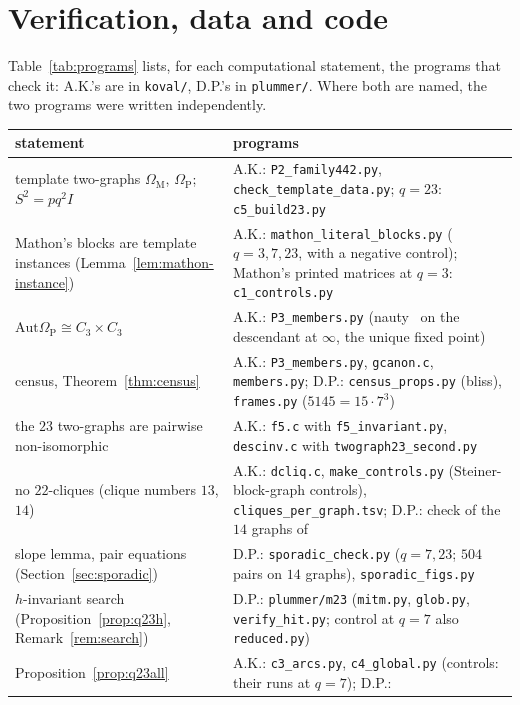 \documentclass[11pt]{amsart}
\theoremstyle{definition}
\theoremstyle{remark}
\newcommand{\Aut}{\mathrm{Aut}}
\newcommand{\code}[1]{\texttt{#1}}
\newcommand{\OM}{\Omega_{\mathrm M}}   %
\newcommand{\OP}{\Omega_{\mathrm P}}   %
\begin{document}
\section{Verification, data and code}\label{sec:verification}
Table~\ref{tab:programs} lists, for each computational statement, the programs that check it: A.K.'s are in
\code{koval/}, D.P.'s in \code{plummer/}. Where both are named, the two programs were written independently.

\begin{table}[!ht]
\centering\small
\begin{tabular}{p{}p{}}
\toprule
statement & programs\\
\midrule
template two-graphs $\OM$, $\OP$; $S^2=pq^2I$ & A.K.: \code{P2\_family442.py}, \code{check\_template\_data.py}; $q=23$: \code{c5\_build23.py}\\
Mathon's blocks are template instances (Lemma~\ref{lem:mathon-instance}) & A.K.: \code{mathon\_literal\_blocks.py}
($q=3,7,23$, with a negative control); Mathon's printed matrices at $q=3$: \code{c1\_controls.py}\\
$\Aut\OP\cong C_3\times C_3$ & A.K.: \code{P3\_members.py} (nauty~\cite{nauty} on the descendant at $\infty$, the unique fixed point)\\
census, Theorem~\ref{thm:census} & A.K.: \code{P3\_members.py}, \code{gcanon.c}, \code{members.py}; D.P.:
\code{census\_props.py} (bliss), \code{frames.py} ($5145=15\cdot7^3$)\\
the $23$ two-graphs are pairwise non-isomorphic & A.K.: \code{f5.c} with \code{f5\_invariant.py}, \code{descinv.c} with \code{twograph23\_second.py}\\
no $22$-cliques (clique numbers $13$, $14$) & A.K.: \code{dcliq.c}, \code{make\_controls.py} (Steiner-block-graph controls), \code{cliques\_per\_graph.tsv};
D.P.: check of the $14$ graphs of~\cite{Plummer442}\\
slope lemma, pair equations (Section~\ref{sec:sporadic}) & D.P.: \code{sporadic\_check.py} ($q=7,23$; $504$ pairs on $14$
graphs), \code{sporadic\_figs.py}\\
$h$-invariant search (Proposition~\ref{prop:q23h}, Remark~\ref{rem:search}) & D.P.: \code{plummer/m23} (\code{mitm.py},
\code{glob.py}, \code{verify\_hit.py}; control at $q=7$ also \code{reduced.py})\\
Proposition~\ref{prop:q23all} & A.K.: \code{c3\_arcs.py}, \code{c4\_global.py} (controls: their runs at $q=7$); D.P.:

\end{tabular}
\end{table}
\end{document}
